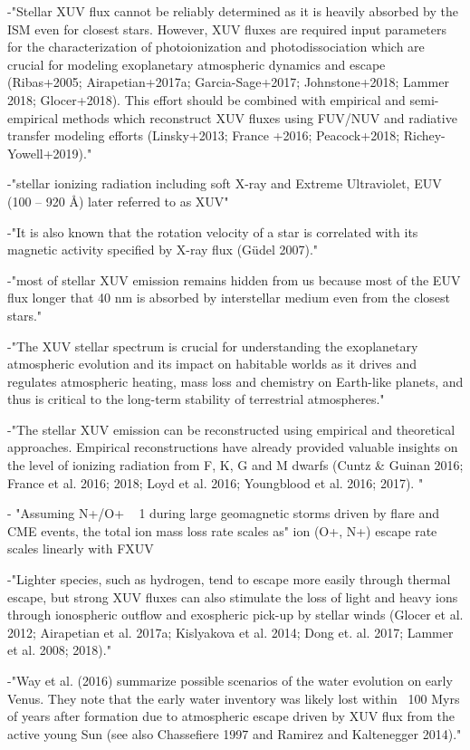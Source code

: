 \documentclass[twocolumn]{aastex62}
\begin{document}
-"Stellar XUV flux cannot be reliably determined as it is heavily absorbed by the ISM
even for closest stars. However, XUV fluxes are required input parameters for the characterization
of photoionization and photodissociation which are crucial for modeling exoplanetary atmospheric
dynamics and escape (Ribas+2005; Airapetian+2017a; Garcia-Sage+2017; Johnstone+2018; 
Lammer 2018; Glocer+2018). This effort should be combined with empirical and semi-empirical
methods which reconstruct XUV fluxes using FUV/NUV and radiative transfer modeling efforts
(Linsky+2013; France +2016; Peacock+2018; Richey-Yowell+2019)."

-"stellar ionizing radiation including soft X-ray and Extreme
Ultraviolet, EUV (100 – 920 Å) later referred to as XUV"

-"It is also known
that the rotation velocity of a star is correlated with its magnetic activity specified by X-ray
flux (Güdel 2007)."

-"most of stellar XUV emission remains
hidden from us because most of the EUV flux longer that 40 nm is absorbed by interstellar
medium even from the closest stars."

-"The XUV stellar spectrum is crucial for understanding the
exoplanetary atmospheric evolution and its impact on habitable worlds as it drives and regulates
atmospheric heating, mass loss and chemistry on Earth-like planets, and thus is critical to the
long-term stability of terrestrial atmospheres."

-"The stellar XUV emission can be reconstructed using empirical and theoretical
approaches. Empirical reconstructions have already provided valuable insights on the level of
ionizing radiation from F, K, G and M dwarfs (Cuntz & Guinan 2016; France et al. 2016; 2018;
Loyd et al. 2016; Youngblood et al. 2016; 2017). "

- "Assuming N+/O+ ~ 1 during large
geomagnetic storms driven by flare and CME events, the total ion mass loss rate scales as" ion (O+, N+) escape rate scales linearly with FXUV

-"Lighter species, such as hydrogen, tend to escape more easily through thermal escape, but
strong XUV fluxes can also stimulate the loss of light and heavy ions through ionospheric
outflow and exospheric pick-up by stellar winds (Glocer et al. 2012; Airapetian et al. 2017a;
Kislyakova et al. 2014; Dong et. al. 2017; Lammer et al. 2008; 2018)."

-"Way et al. (2016) summarize possible scenarios of the
water evolution on early Venus. They note that the early water inventory was likely lost within
~100 Myrs of years after formation due to atmospheric escape driven by XUV flux from the
active young Sun (see also Chassefiere 1997 and Ramirez and Kaltenegger 2014)."
\end{document}
